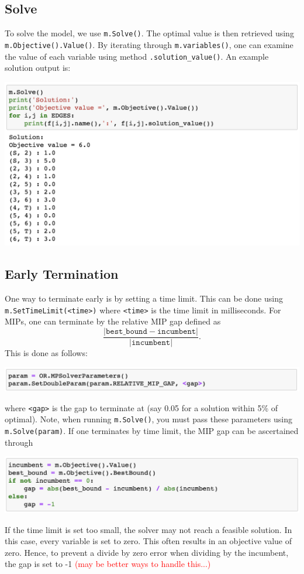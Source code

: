 \documentclass[11 pt]{article}
\newcommand{\code}[1]{\colorbox{gray!10}{\textcolor{black!85}{\texttt{#1}}}}
\begin{document}
\subsection{Solve}

To solve the model, we use \code{m.Solve()}. The optimal value is then retrieved using \code{m.Objective().Value()}. By iterating through \code{m.variables()}, one can examine the value of each variable using method \code{.solution\_value()}. An example solution output is:
\begin{center}
\includegraphics[scale=0.7]{images/sol.png}
\end{center}

\subsection{Early Termination}

One way to terminate early is by setting a time limit. This can be done using \code{m.SetTimeLimit(<time>)} where \texttt{<time>} is the time limit in milliseconds. For MIPs, one can terminate by the relative MIP gap defined as 
$$\frac{|\texttt{best\_bound} - \texttt{incumbent}|}{|\texttt{incumbent}|}.$$
This is done as follows: 
\begin{center}
\includegraphics[scale=0.7]{images/gap.png}
\end{center}
where \texttt{<gap>} is the gap to terminate at (say 0.05 for a solution within 5\% of optimal). Note, when running \code{m.Solve()}, you must pass these parameters using \code{m.Solve(param)}. If one terminates by time limit, the MIP gap can be ascertained through
\begin{center}
\includegraphics[scale=0.7]{images/gapDef.png}
\end{center}
If the time limit is set too small, the solver may not reach a feasible solution. In this case, every variable is set to zero. This often results in an objective value of zero. Hence, to prevent a divide by zero error when dividing by the incumbent, the gap is set to -1 \textcolor{red}{(may be better ways to handle this...)}
\end{document}
